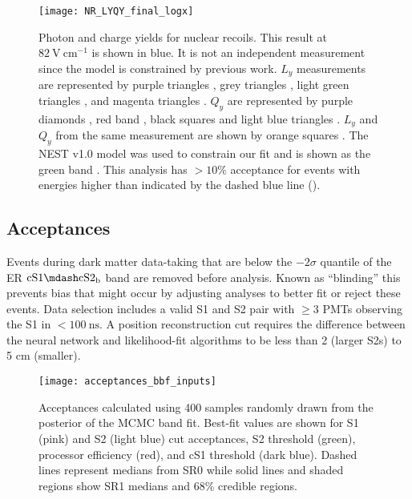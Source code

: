\begin{figure}
\centering
\texttt{[image: NR\_LYQY\_final\_logx]}
\caption{Photon and charge yields for nuclear recoils.  This result at $82\ \mathrm{V\ cm^{-1}}$ is shown in blue.  It is not
an independent measurement since the model is constrained by previous work.  $L_y$ measurements are represented by purple triangles
, grey triangles , light green triangles , and magenta triangles
.  $Q_y$ are represented by purple diamonds , red band , black squares
 and light blue triangles .  $L_y$ and $Q_y$ from the same measurement are shown by orange
squares
.  The NEST v1.0 model was used to constrain our fit and is shown as the green band .  This
analysis has $> 10\%$ acceptance for events with energies higher than indicated by the dashed blue line
().}
\label{fig:er_nr_calibrations_results_ly_qy_nr}
\end{figure}



\subsection{Acceptances}
\label{subsec:dark_matter_results_selection}
Events during dark matter data-taking that are below the $-2 \sigma$ quantile of the ER $\mathrm{cS1} \mdash \mathrm{cS2_b}$ band are
removed before analysis.  Known as ``blinding'' this prevents bias that might occur by adjusting analyses to better fit or reject
these events.  Data selection includes a valid S1 and S2 pair with $\geq 3$ PMTs observing the S1 in $< 100\ \mathrm{ns}$.  A position
reconstruction cut requires the difference between the neural network and likelihood-fit algorithms to be less than 2 (larger S2s) to 5
cm (smaller).

\begin{figure}
\centering
\texttt{[image: acceptances\_bbf\_inputs]}
\caption{Acceptances calculated using 400 samples randomly drawn from the posterior of the MCMC band fit.  Best-fit values are shown for
S1 (pink) and S2 (light blue) cut acceptances, S2 threshold (green), processor efficiency (red), and cS1 threshold
(dark blue).  Dashed lines represent medians from SR0 while solid lines and shaded regions show SR1 medians and 68\% credible regions.}
\label{fig:dark_matter_results_selection_acc_components}
\end{figure}

